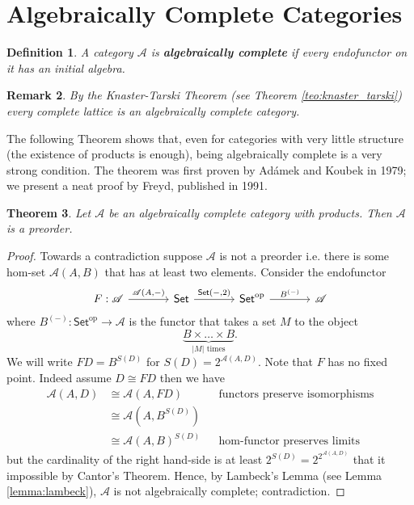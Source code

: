 \documentclass[letterpaper, 11pt, oneside]{memoir}
\theoremstyle{myteo}
\newtheorem{theorem}{Theorem}[section]
\newtheorem{definition}[theorem]{Definition}
\newtheorem{remark}[theorem]{Remark}
\numberwithin{equation}{section}
\newcommand{\marginnote}[1]{\marginpar{\footnotesize #1}}
\newcommand{\Set}{\textsf{Set}}
\newcommand{\op}{\text{op}}
\newcommand{\A}{\mathscr{A}}
\begin{document}
\section{Algebraically Complete Categories}

\begin{definition}
  A category \(\A\) is \textbf{algebraically complete} \marginnote{algebraically complete category} if every endofunctor on it has an initial algebra.
\end{definition}

\begin{remark}
  By the Knaster-Tarski Theorem (see Theorem \ref{teo:knaster_tarski}) every complete lattice is an algebraically complete category.
\end{remark}

The following Theorem shows that, even for categories with very little structure (the existence of products is enough), being algebraically complete is a very strong condition.
The theorem was first proven by Adámek and Koubek in 1979; we present a neat proof by Freyd, published in 1991.

\begin{theorem}
  Let \(\A\) be an algebraically complete category with products.
  Then \(\A\) is a preorder.
\end{theorem}

\begin{proof}
  Towards a contradiction suppose \(\A\) is not a preorder i.e. there is some hom-set \(\A(A, B)\) that has at least two elements.
  Consider the endofunctor
  \begin{equation*}
    \begin{tikzcd}[sep=large]
      F : \A \ar[r, "{\A(A, -)}"] & \Set \ar[r, "{\Set(-, 2)}"] & \Set^\op \ar[r, "B^{(-)}"] & \A
    \end{tikzcd}
  \end{equation*}
  where \(B^{(-)}: \Set^\op \to \A\) is the functor that takes a set \(M\) to the object
  \begin{equation*}
    \underbrace{B \times \ldots \times B}_{|M| \text{ times}}.
  \end{equation*}
  We will write \(FD = B^{S(D)}\) for \(S(D) = 2^{\A(A, D)}\).
  Note that \(F\) has no fixed point.
  Indeed assume \(D \cong FD\) then we have
  \begin{align*}
    \A(A, D) & \cong \A(A, FD) && \text{functors preserve isomorphisms}\\
             & \cong \A(A, B^{S(D)}) &&\\
             & \cong \A(A, B)^{S(D)} && \text{hom-functor preserves limits}
  \end{align*}
  but the cardinality of the right hand-side is at least \(2^{S(D)} = 2^{2^{\A(A, D)}}\) that it impossible by Cantor's Theorem.
  Hence, by Lambeck's Lemma (see Lemma \ref{lemma:lambeck}), \(\A\) is not algebraically complete; contradiction.
\end{proof}
\end{document}
